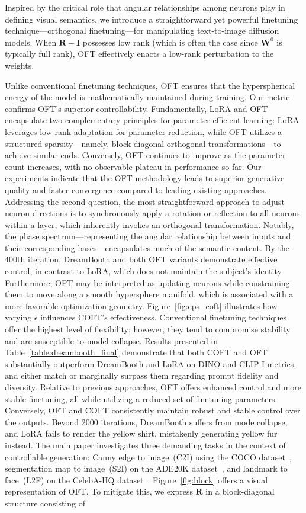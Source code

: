 {Inspired by the critical role that angular relationships among neurons play in defining visual semantics, we introduce a straightforward yet powerful finetuning technique—orthogonal finetuning—for manipulating text-to-image diffusion models. When $\bm{R}-\bm{I}$ possesses low rank (which is often the case since $\bm{W}^0$ is typically full rank), OFT effectively enacts a low-rank perturbation to the weights. \item Unlike conventional finetuning techniques, OFT ensures that the hyperspherical energy of the model is mathematically maintained during training. Our metric confirms OFT’s superior controllability. Fundamentally, LoRA and OFT encapsulate two complementary principles for parameter-efficient learning: LoRA leverages low-rank adaptation for parameter reduction, while OFT utilizes a structured sparsity—namely, block-diagonal orthogonal transformations—to achieve similar ends. Conversely, OFT continues to improve as the parameter count increases, with no observable plateau in performance so far. Our experiments indicate that the OFT methodology leads to superior generative quality and faster convergence compared to leading existing approaches. Addressing the second question, the most straightforward approach to adjust neuron directions is to synchronously apply a rotation or reflection to all neurons within a layer, which inherently invokes an orthogonal transformation. Notably, the phase spectrum—representing the angular relationship between inputs and their corresponding bases—encapsulates much of the semantic content. By the 400th iteration, DreamBooth and both OFT variants demonstrate effective control, in contrast to LoRA, which does not maintain the subject’s identity. Furthermore, OFT may be interpreted as updating neurons while constraining them to move along a smooth hypersphere manifold, which is associated with a more favorable optimization geometry. Figure~\ref{fig:eps_coft} illustrates how varying $\epsilon$ influences COFT’s effectiveness. Conventional finetuning techniques offer the highest level of flexibility; however, they tend to compromise stability and are susceptible to model collapse. Results presented in Table~\ref{table:dreambooth_final} demonstrate that both COFT and OFT substantially outperform DreamBooth and LoRA on DINO and CLIP-I metrics, and either match or marginally surpass them regarding prompt fidelity and diversity. Relative to previous approaches, OFT offers enhanced control and more stable finetuning, all while utilizing a reduced set of finetuning parameters. Conversely, OFT and COFT consistently maintain robust and stable control over the outputs. Beyond 2000 iterations, DreamBooth suffers from mode collapse, and LoRA fails to render the yellow shirt, mistakenly generating yellow fur instead. The main paper investigates three demanding tasks in the context of controllable generation: Canny edge to image~(C2I) using the COCO dataset~\cite{lin2014microsoft}, segmentation map to image~(S2I) on the ADE20K dataset~\cite{zhou2017scene}, and landmark to face~(L2F) on the CelebA-HQ dataset~\cite{karras2018progressive,xia2021tedigan}. Figure~\ref{fig:block} offers a visual representation of OFT. To mitigate this, we express $\bm{R}$ in a block-diagonal structure consisting of }
